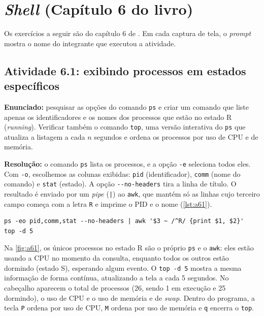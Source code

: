 \chapter{\textit{Shell} (Capítulo 6 do livro)}\label{cap:linux6}

Os exercícios a seguir são do capítulo 6 de . Em cada captura de tela,
o \textit{prompt} mostra o nome do integrante que executou a atividade.

\section{Atividade 6.1: exibindo processos em estados específicos}\label{sec:a61}

\textbf{Enunciado:} pesquisar as opções do comando \texttt{ps} e criar um comando que liste
apenas os identificadores e os nomes dos processos que estão no estado R (\textit{running}).
Verificar também o comando \texttt{top}, uma versão interativa do \texttt{ps} que atualiza a
listagem a cada $n$ segundos e ordena os processos por uso de CPU e de memória.

\textbf{Resolução:} o comando \texttt{ps} lista os processos, e a opção \texttt{-e} seleciona
todos eles. Com \texttt{-o}, escolhemos as colunas exibidas: \texttt{pid} (identificador),
\texttt{comm} (nome do comando) e \texttt{stat} (estado). A opção \texttt{-{}-no-headers} tira a
linha de título. O resultado é enviado por um \textit{pipe} (\texttt{|}) ao \texttt{awk}, que
mantém só as linhas cujo terceiro campo começa com a letra \texttt{R} e imprime o PID e o nome
(\autoref{lst:a61}).

\begin{lstlisting}[caption={Atividade 6.1: processos no estado R e \texttt{top}},label={lst:a61}]
ps -eo pid,comm,stat --no-headers | awk '$3 ~ /^R/ {print $1, $2}'
top -d 5
\end{lstlisting}

Na \autoref{fig:a61}, os únicos processos no estado R são o próprio \texttt{ps} e o
\texttt{awk}: eles estão usando a CPU no momento da consulta, enquanto todos os outros estão
dormindo (estado S), esperando algum evento. O \texttt{top -d 5} mostra a mesma informação de
forma contínua, atualizando a tela a cada 5 segundos. No cabeçalho aparecem o total de
processos (26, sendo 1 em execução e 25 dormindo), o uso de CPU e o uso de memória e de
\textit{swap}. Dentro do programa, a tecla \texttt{P} ordena por uso de CPU, \texttt{M} ordena
por uso de memória e \texttt{q} encerra o \texttt{top}.

